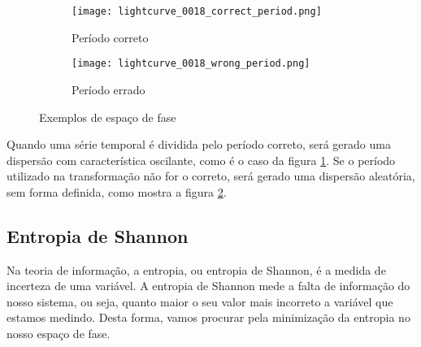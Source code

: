 

\begin{figure}[h!]
\centering
\begin{subfigure}{.5\textwidth}
  \centering
  \texttt{[image: lightcurve\_0018\_correct\_period.png]}
  \caption{Período correto}
  \label{fig:right}
\end{subfigure}%
\begin{subfigure}{.5\textwidth}
  \centering
  \texttt{[image: lightcurve\_0018\_wrong\_period.png]}
  \caption{Período errado}
  \label{fig:wrong}
\end{subfigure}
\caption{Exemplos de espa\c{c}o de fase}
\label{fig:exemplo}
\end{figure}

Quando uma série temporal é dividida pelo período correto, será gerado uma dispersão com característica oscilante, como é o caso da figura \ref{fig:right}. Se o período utilizado na transforma\c{c}ão não for o correto, será gerado uma dispersão aleatória, sem forma definida, como mostra a figura \ref{fig:wrong}. 

\subsection{Entropia de Shannon}

Na teoria de informação, a entropia, ou entropia de Shannon, é a medida de incerteza de uma variável. A entropia de Shannon mede a falta de informação do nosso sistema, ou seja, quanto maior o seu valor mais incorreto a variável que estamos medindo. Desta forma, vamos procurar pela minimização da entropia no nosso espaço de fase.

